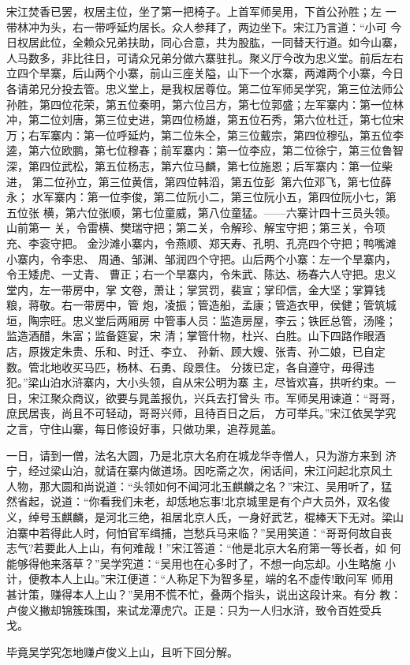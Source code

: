 宋江焚香已罢，权居主位，坐了第一把椅子。上首军师吴用，下首公孙胜；左
一带林冲为头，右一带呼延灼居长。众人参拜了，两边坐下。宋江乃言道：“小可
今日权居此位，全赖众兄弟扶助，同心合意，共为股肱，一同替天行道。如今山寨，
人马数多，非比往日，可请众兄弟分做六寨驻扎。聚义厅今改为忠义堂。前后左右
立四个旱寨，后山两个小寨，前山三座关隘，山下一个水寨，两滩两个小寨，今日
各请弟兄分投去管。忠义堂上，是我权居尊位。第二位军师吴学究，第三位法师公
孙胜，第四位花荣，第五位秦明，第六位吕方，第七位郭盛；左军寨内：第一位林
冲，第二位刘唐，第三位史进，第四位杨雄，第五位石秀，第六位杜迁，第七位宋
万；右军寨内：第一位呼延灼，第二位朱仝，第三位戴宗，第四位穆弘，第五位李
逵，第六位欧鹏，第七位穆春；前军寨内：第一位李应，第二位徐宁，第三位鲁智
深，第四位武松，第五位杨志，第六位马麟，第七位施恩；后军寨内：第一位柴进，
第二位孙立，第三位黄信，第四位韩滔，第五位彭，第六位邓飞，第七位薛永；
水军寨内：第一位李俊，第二位阮小二，第三位阮小五，第四位阮小七，第五位张
横，第六位张顺，第七位童威，第八位童猛。——六寨计四十三员头领。山前第一
关，令雷横、樊瑞守把；第二关，令解珍、解宝守把；第三关，令项充、李衮守把。
金沙滩小寨内，令燕顺、郑天寿、孔明、孔亮四个守把；鸭嘴滩小寨内，令李忠、
周通、邹渊、邹润四个守把。山后两个小寨：左一个旱寨内，令王矮虎、一丈青、
曹正；右一个旱寨内，令朱武、陈达、杨春六人守把。忠义堂内，左一带房中，掌
文卷，萧让；掌赏罚，裴宣；掌印信，金大坚；掌算钱粮，蒋敬。右一带房中，管
炮，凌振；管造船，孟康；管造衣甲，侯健；管筑城垣，陶宗旺。忠义堂后两厢房
中管事人员：监造房屋，李云；铁匠总管，汤隆；监造酒醋，朱富；监备筵宴，宋
清；掌管什物，杜兴、白胜。山下四路作眼酒店，原拨定朱贵、乐和、时迁、李立、
孙新、顾大嫂、张青、孙二娘，已自定数。管北地收买马匹，杨林、石勇、段景住。
分拨已定，各自遵守，毋得违犯。”梁山泊水浒寨内，大小头领，自从宋公明为寨
主，尽皆欢喜，拱听约束。一日，宋江聚众商议，欲要与晁盖报仇，兴兵去打曾头
市。军师吴用谏道：“哥哥，庶民居丧，尚且不可轻动，哥哥兴师，且待百日之后，
方可举兵。”宋江依吴学究之言，守住山寨，每日修设好事，只做功果，追荐晁盖。

一日，请到一僧，法名大圆，乃是北京大名府在城龙华寺僧人，只为游方来到
济宁，经过梁山泊，就请在寨内做道场。因吃斋之次，闲话间，宋江问起北京风土
人物，那大圆和尚说道：“头领如何不闻河北玉麒麟之名？”宋江、吴用听了，猛
然省起，说道：“你看我们未老，却恁地忘事!北京城里是有个卢大员外，双名俊
义，绰号玉麒麟，是河北三绝，祖居北京人氏，一身好武艺，棍棒天下无对。梁山
泊寨中若得此人时，何怕官军缉捕，岂愁兵马来临？”吴用笑道：“哥哥何故自丧
志气?若要此人上山，有何难哉！”宋江答道：“他是北京大名府第一等长者，如
何能够得他来落草？”吴学究道：“吴用也在心多时了，不想一向忘却。小生略施
小计，便教本人上山。”宋江便道：“人称足下为智多星，端的名不虚传!敢问军
师用甚计策，赚得本人上山？”吴用不慌不忙，叠两个指头，说出这段计来。有分
教：卢俊义撇却锦簇珠围，来试龙潭虎穴。正是：只为一人归水浒，致令百姓受兵
戈。

毕竟吴学究怎地赚卢俊义上山，且听下回分解。